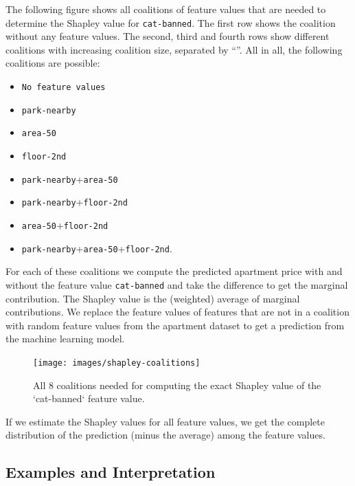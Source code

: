 \documentclass[
  12pt,
]{krantz}
\providecommand{\tightlist}{%
  \setlength{\itemsep}{0pt}\setlength{\parskip}{0pt}}
\begin{document}
The following figure shows all coalitions of feature values that are needed to determine the Shapley value for \texttt{cat-banned}.
The first row shows the coalition without any feature values.
The second, third and fourth rows show different coalitions with increasing coalition size, separated by ``\textbar{}''.
All in all, the following coalitions are possible:

\begin{itemize}
\tightlist
\item
  \texttt{No\ feature\ values}
\item
  \texttt{park-nearby}
\item
  \texttt{area-50}
\item
  \texttt{floor-2nd}
\item
  \texttt{park-nearby}+\texttt{area-50}
\item
  \texttt{park-nearby}+\texttt{floor-2nd}
\item
  \texttt{area-50}+\texttt{floor-2nd}
\item
  \texttt{park-nearby}+\texttt{area-50}+\texttt{floor-2nd}.
\end{itemize}

For each of these coalitions we compute the predicted apartment price with and without the feature value \texttt{cat-banned} and take the difference to get the marginal contribution.
The Shapley value is the (weighted) average of marginal contributions.
We replace the feature values of features that are not in a coalition with random feature values from the apartment dataset to get a prediction from the machine learning model.

\begin{figure}

{\centering \texttt{[image: images/shapley-coalitions]} 

}

\caption{All 8 coalitions needed for computing the exact Shapley value of the `cat-banned` feature value.}\label{fig:shapley-coalitions}
\end{figure}

If we estimate the Shapley values for all feature values, we get the complete distribution of the prediction (minus the average) among the feature values.

\hypertarget{examples-and-interpretation}{%
\subsection{Examples and Interpretation}\label{examples-and-interpretation}}
\end{document}
